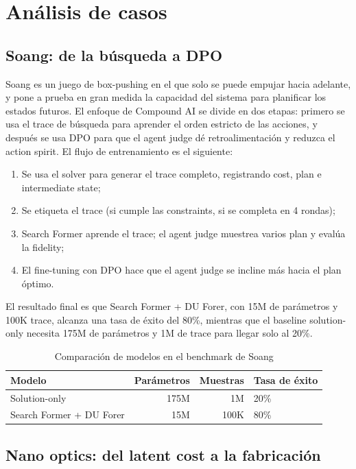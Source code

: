 \section{Análisis de casos}

\subsection{Soang: de la búsqueda a DPO}

Soang es un juego de box-pushing en el que solo se puede empujar hacia adelante, y pone a prueba en gran medida la capacidad del sistema para planificar los estados futuros. El enfoque de Compound AI se divide en dos etapas: primero se usa el trace de búsqueda para aprender el orden estricto de las acciones, y después se usa DPO para que el agent judge dé retroalimentación y reduzca el action spirit. El flujo de entrenamiento es el siguiente:
\begin{enumerate}
    \item Se usa el solver para generar el trace completo, registrando cost, plan e intermediate state;
    \item Se etiqueta el trace (si cumple las constraints, si se completa en 4 rondas);
    \item Search Former aprende el trace; el agent judge muestrea varios plan y evalúa la fidelity;
    \item El fine-tuning con DPO hace que el agent judge se incline más hacia el plan óptimo.
\end{enumerate}
El resultado final es que Search Former + DU Forer, con 15M de parámetros y 100K trace, alcanza una tasa de éxito del 80\%, mientras que el baseline solution-only necesita 175M de parámetros y 1M de trace para llegar solo al 20\%.
\begin{table}[H]
\centering
\begin{tabular}{lrrl}
\toprule
Modelo & Parámetros & Muestras & Tasa de éxito \\
\midrule
Solution-only & 175M & 1M & 20\% \\
Search Former + DU Forer & 15M & 100K & 80\% \\
\bottomrule
\end{tabular}
\caption{Comparación de modelos en el benchmark de Soang}
\end{table}

\subsection{Nano optics: del latent cost a la fabricación}


